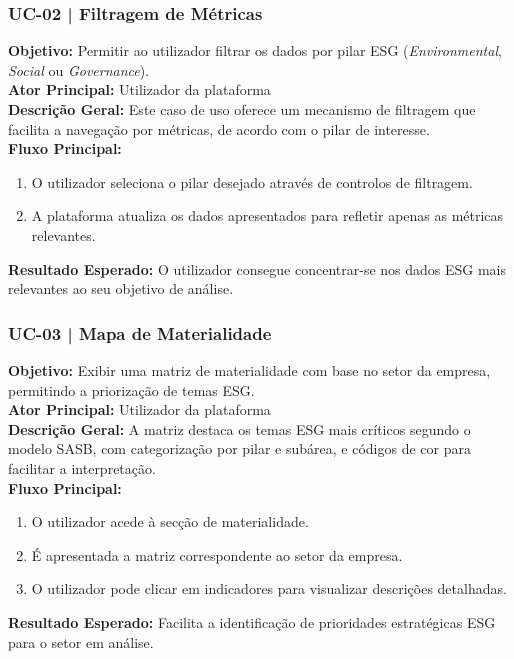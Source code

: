 \subsubsection{UC-02 | Filtragem de Métricas}

\textbf{Objetivo:} Permitir ao utilizador filtrar os dados por pilar ESG (\textit{Environmental}, \textit{Social} ou \textit{Governance}).\\
\textbf{Ator Principal:} Utilizador da plataforma\\
\textbf{Descrição Geral:} Este caso de uso oferece um mecanismo de filtragem que facilita a navegação por métricas, de acordo com o pilar de interesse.\\
\textbf{Fluxo Principal:}
\begin{enumerate}
    \item O utilizador seleciona o pilar desejado através de controlos de filtragem.
    \item A plataforma atualiza os dados apresentados para refletir apenas as métricas relevantes.
\end{enumerate}
\textbf{Resultado Esperado:} O utilizador consegue concentrar-se nos dados ESG mais relevantes ao seu objetivo de análise.

\subsubsection{UC-03 | Mapa de Materialidade}

\textbf{Objetivo:} Exibir uma matriz de materialidade com base no setor da empresa, permitindo a priorização de temas ESG.\\
\textbf{Ator Principal:} Utilizador da plataforma\\
\textbf{Descrição Geral:} A matriz destaca os temas ESG mais críticos segundo o modelo SASB, com categorização por pilar e subárea, e códigos de cor para facilitar a interpretação.\\
\textbf{Fluxo Principal:}
\begin{enumerate}
    \item O utilizador acede à secção de materialidade.
    \item É apresentada a matriz correspondente ao setor da empresa.
    \item O utilizador pode clicar em indicadores para visualizar descrições detalhadas.
\end{enumerate}
\textbf{Resultado Esperado:} Facilita a identificação de prioridades estratégicas ESG para o setor em análise.

